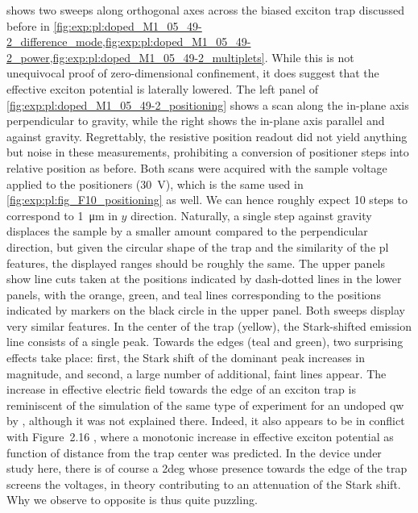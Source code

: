  shows two sweeps along orthogonal axes across the biased exciton trap discussed before in \cref{fig:exp:pl:doped_M1_05_49-2_difference_mode,fig:exp:pl:doped_M1_05_49-2_power,fig:exp:pl:doped_M1_05_49-2_multiplets}.
While this is not unequivocal proof of zero-dimensional confinement, it does suggest that the effective exciton potential is laterally lowered.
The left panel of \cref{fig:exp:pl:doped_M1_05_49-2_positioning} shows a scan along the in-plane axis perpendicular to gravity, while the right shows the in-plane axis parallel and against gravity.
Regrettably, the resistive position readout did not yield anything but noise in these measurements, prohibiting a conversion of positioner steps into relative position as before.
Both scans were acquired with the sample voltage applied to the positioners (\qty{30}{\volt}), which is the same used in \cref{fig:exp:pl:fig_F10_positioning} as well.
We can hence roughly expect \num{10} steps to correspond to \qty{1}{\micro\meter} in $y$ direction.
Naturally, a single step against gravity displaces the sample by a smaller amount compared to the perpendicular direction, but given the circular shape of the trap and the similarity of the \gls{pl} features, the displayed ranges should be roughly the same.
The upper panels show line cuts taken at the positions indicated by dash-dotted lines in the lower panels, with the orange, green, and teal lines corresponding to the positions indicated by markers on the black circle in the upper panel.
Both sweeps display very similar features.
In the center of the trap (yellow), the Stark-shifted emission line consists of a single peak.
Towards the edges (teal and green), two surprising effects take place: first, the Stark shift of the dominant peak increases in magnitude, and second, a large number of additional, faint lines appear.
The increase in effective electric field towards the edge of an exciton trap is reminiscent of the simulation of the same type of experiment for an undoped \gls{qw} by \textcite[Figure~6.4]{Descamps2021}, although it was not explained there.
Indeed, it also appears to be in conflict with Figure~2.16 \ibid, where a monotonic increase in effective exciton potential as function of distance from the trap center was predicted.
In the device under study here, there is of course a \gls{2deg} whose presence towards the edge of the trap screens the voltages, in theory contributing to an attenuation of the Stark shift.
Why we observe to opposite is thus quite puzzling.

